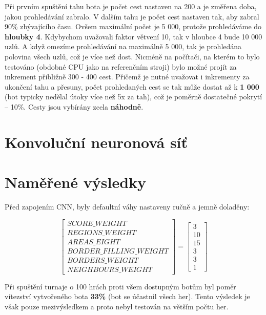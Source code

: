 \documentclass[12pt]{article}
\begin{document}
Při prvním spuštění tahu bota je počet cest nastaven na 200 a je změřena doba, jakou prohledávání zabralo. V dalším tahu je počet cest nastaven tak, aby zabral 90\% zbývajícího času. Ovšem maximální počet je 5 000, protože prohledáváme do \textbf{hloubky 4}. Kdybychom uvažovali faktor větvení 10, tak v hloubce 4 bude 10 000 uzlů. A když omezíme prohledávání na maximálně 5 000, tak je prohledána polovina všech uzlů, což je více než dost. Nicméně na počítači, na kterém to bylo testováno (obdobné CPU jako na referenčním stroji) bylo možné projít za inkrement přibližně 300 - 400 cest. Přičemž je nutné uvažovat i inkrementy za ukončení tahu a přesuny, počet prohledaných cest se tak může dostat až k \textbf{1 000} (bot typicky nedělal útoky více než 5x za tah), což je poměrně dostatečné pokrytí -- 10\%. Cesty jsou vybírány zcela \textbf{náhodně}.

\section{Konvoluční neuronová síť}
\label{cnn}

\section{Naměřené výsledky}
Před zapojením CNN, byly defaultní váhy nastaveny ručně a jemně doladěny:

\[
\begin{bmatrix}
SCORE\_WEIGHT \\
REGIONS\_WEIGHT \\
AREAS\_EIGHT \\
BORDER\_FILLING\_WEIGHT \\
BORDERS\_WEIGHT \\
NEIGHBOURS\_WEIGHT
\end{bmatrix} = \begin{bmatrix}
3 \\
10 \\
15 \\
3 \\
3 \\
1
\end{bmatrix}
\]

Při spuštění turnaje o 100 hrách proti všem dostupným botům byl poměr vítezství vytvořeného bota \textbf{33\%} (bot se účastnil všech her). Tento výsledek je však pouze mezivýsledkem a proto nebyl testován na větším počtu her.


\newpage
 

\end{document}
